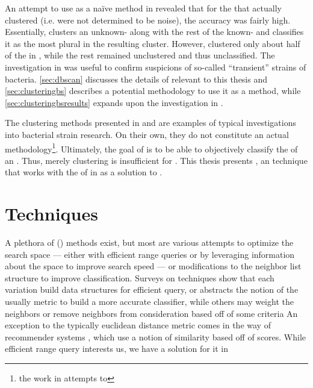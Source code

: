 An attempt to use \cite{johnson2015density} as a na{\"i}ve \mst{} method in \cite{DBLP:conf/bcb/McGovernJDBKV16} revealed that for the \isols{} that actually clustered (i.e. were not determined to be noise), the accuracy was fairly high.
Essentially, \cite{DBLP:conf/bcb/McGovernJDBKV16} clusters an unknown-\spec{} \isol{} along with the rest of the known-\spec{} \isols{} \cplop{} and classifies it as the most plural \spec{} in the resulting cluster.
However, \cite{johnson2015density} clustered only about half of the \isols{} in \cplop{}, while the rest remained unclustered and thus unclassified.
The investigation in \cite{DBLP:conf/bcb/McGovernJDBKV16} was useful to confirm suspicions of so-called ``transient'' strains of \ecoli{} bacteria.
\autoref{sec:dbscan} discusses the details of \cite{johnson2015density} relevant to this thesis and \autoref{sec:clusteringbs} describes a potential methodology to use it as a \mst{} method, while \autoref{sec:clusteringbsresults} expands upon the investigation in \cite{DBLP:conf/bcb/McGovernJDBKV16}.

The clustering methods presented in \cite{DBLP:conf/bibm/MontanaDNBK11, montana2012investigating, SolimanDVMBNWKG12, montana2013ontological, montana2013algorithms} and \cite{johnson2015density} are examples of typical investigations into bacterial strain research.
On their own, they do not constitute an actual \mst{} methodology\footnote{the work in \cite{DBLP:conf/bcb/McGovernJDBKV16} attempts to}.
Ultimately, the goal of \cplop{} is to be able to objectively classify the \spec{} of an \ecoli{} \isol{}.
Thus, merely clustering \isols{} is insufficient for \mst{}.
This thesis presents \krap{}, an \mst{} technique that works with the \pyros{} of \isols{} in \cplop{} as a solution to \mst{}.

\section{\kNN{} Techniques}
A plethora of \kNNlong{} (\kNN{}) methods exist, but most are various attempts to optimize the search space --- either with efficient range queries or by leveraging information about the space to improve search speed --- or modifications to the neighbor list structure to improve classification.
Surveys on \kNN{} techniques \cite{DBLP:journals/corr/abs-1007-0085, DBLP:conf/fskd/JiangCWJ07} show that each variation build data structures for efficient query, or abstracts the notion of the usually \euclid{} metric to build a more accurate classifier, while others may weight the neighbors or remove neighbors from consideration based off of some criteria
An exception to the typically euclidean distance metric comes in the way of recommender systems \cite{DBLP:reference/rsh/DesrosiersK11, DBLP:reference/sp/NingDK15}, which use a notion of similarity based off of scores.
While efficient range query interests us, we have a solution for it in \cite{johnson2015density} 

